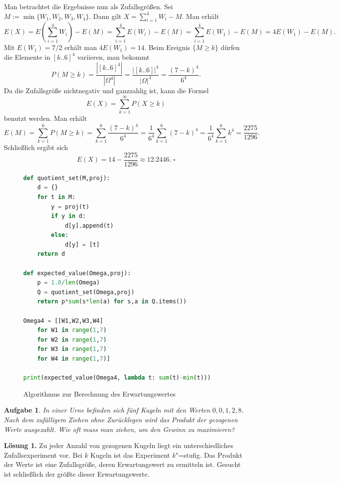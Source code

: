 \documentclass[a4paper,10pt,fleqn,twoside]{scrartcl}
\numberwithin{equation}{section}
\newcommand{\strong}[1]{{\normalfont\sffamily\bfseries #1}}
\renewcommand{\qedsymbol}{\ensuremath{\square}}
\theoremstyle{Aufgabe}
\newtheorem{Aufgabe}{\sffamily Aufgabe}[section]
\begin{document}
Man betrachtet die Ergebnisse nun als Zufallsgrößen. Sei
$M:=\min\{W_1,W_2,W_3,W_4\}$. Dann gilt $X=\sum_{i=1}^4 W_i-M$.
Man erhält
\[E(X) = E(\sum_{i=1}^4 W_i)-E(M) = \sum_{i=1}^4 E(W_i)-E(M)
= \sum_{i=1}^4 E(W_1)-E(M) = 4E(W_1)-E(M).\]
Mit $E(W_1)=7/2$ erhält man $4E(W_1)=14$. Beim Ereignis
$\{M\ge k\}$ dürfen die Elemente in
$[k..6]^4$ variieren, man bekommt%
\[P(M\ge k) = \frac{|[k..6]^4|}{|\Omega^4|}
= \frac{|[k..6]|^4}{|\Omega|^4} = \frac{(7-k)^4}{6^4}.\]
Da die Zufallsgröße nichtnegativ und ganzzahlig ist, kann die Formel%
\[E(X) = \sum_{k=1}^\infty P(X\ge k)\]
benutzt werden. Man erhält
\[E(M) = \sum_{k=1}^6 P(M\ge k) = \sum_{k=1}^6 \frac{(7-k)^4}{6^4}
= \frac{1}{6^4}\sum_{k=1}^6 (7-k)^4 = \frac{1}{6^4}\sum_{k=1}^6 k^4
= \frac{2275}{1296}.\]
Schließlich ergibt sich
\[E(X) = 14-\frac{2275}{1296} \approx 12.2446.\;\qedsymbol\]

\begin{figure}[t]
\begin{lstlisting}[language=Python]
def quotient_set(M,proj):
    d = {}
    for t in M:
        y = proj(t)
        if y in d:
            d[y].append(t)
        else:
            d[y] = [t]
    return d

def expected_value(Omega,proj):
    p = 1.0/len(Omega)
    Q = quotient_set(Omega,proj)
    return p*sum(s*len(a) for s,a in Q.items())

Omega4 = [[W1,W2,W3,W4]
    for W1 in range(1,7)
    for W2 in range(1,7)
    for W3 in range(1,7)
    for W4 in range(1,7)]
    
print(expected_value(Omega4, lambda t: sum(t)-min(t)))
\end{lstlisting}
\caption{Algorithmus zur Berechnung des Erwartungswertes}
\label{fig:Algorithmus-Erwartungswert}
\end{figure}

\begin{Aufgabe}
In einer Urne befinden sich fünf Kugeln mit den Werten $0,0,1,2,8$.
Nach dem zufälligem Ziehen ohne Zurücklegen wird das Produkt der
gezogenen Werte ausgezahlt. Wie oft muss man ziehen, um den Gewinn zu
maximieren?
\end{Aufgabe}
\strong{Lösung 1.} Zu jeder Anzahl von gezogenen Kugeln liegt ein
unterschiedliches Zufallsexperiment vor. Bei $k$ Kugeln ist das
Experiment $k$"=stufig. Das Produkt der Werte ist eine Zufallsgröße,
deren Erwartungswert zu ermitteln ist. Gesucht ist schließlich der
größte dieser Erwartungswerte.
\end{document}
